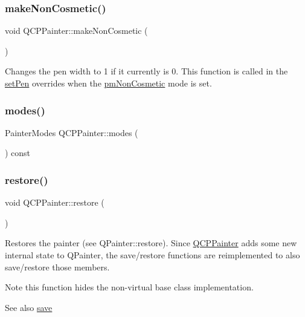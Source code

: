 \subsubsection{\texorpdfstring{make\+Non\+Cosmetic()}{makeNonCosmetic()}}
{\footnotesize\ttfamily void Q\+C\+P\+Painter\+::make\+Non\+Cosmetic (\begin{DoxyParamCaption}{ }\end{DoxyParamCaption})}

Changes the pen width to 1 if it currently is 0. This function is called in the \hyperlink{class_q_c_p_painter_af9c7a4cd1791403901f8c5b82a150195}{set\+Pen} overrides when the \hyperlink{class_q_c_p_painter_a156cf16444ff5e0d81a73c615fdb156dac1e481bfaf408f2bd2eaad3ec341f36b}{pm\+Non\+Cosmetic} mode is set. \mbox{\label{class_q_c_p_painter_aef102658219b24165f7ee2aad1b9e48f}} 
\subsubsection{\texorpdfstring{modes()}{modes()}}
{\footnotesize\ttfamily Painter\+Modes Q\+C\+P\+Painter\+::modes (\begin{DoxyParamCaption}{ }\end{DoxyParamCaption}) const\hspace{0.3cm}{\ttfamily [inline]}}

\mbox{\label{class_q_c_p_painter_a64908e6298d5bbd83457dc987cc3a022}} 
\subsubsection{\texorpdfstring{restore()}{restore()}}
{\footnotesize\ttfamily void Q\+C\+P\+Painter\+::restore (\begin{DoxyParamCaption}{ }\end{DoxyParamCaption})}

Restores the painter (see Q\+Painter\+::restore). Since \hyperlink{class_q_c_p_painter}{Q\+C\+P\+Painter} adds some new internal state to Q\+Painter, the save/restore functions are reimplemented to also save/restore those members.

\begin{DoxyNote}{Note}
this function hides the non-\/virtual base class implementation.
\end{DoxyNote}
\begin{DoxySeeAlso}{See also}
\hyperlink{class_q_c_p_painter_a8fd6821ee6fecbfa04444c9062912abd}{save} 
\end{DoxySeeAlso}
\mbox{\label{class_q_c_p_painter_a8fd6821ee6fecbfa04444c9062912abd}} 
